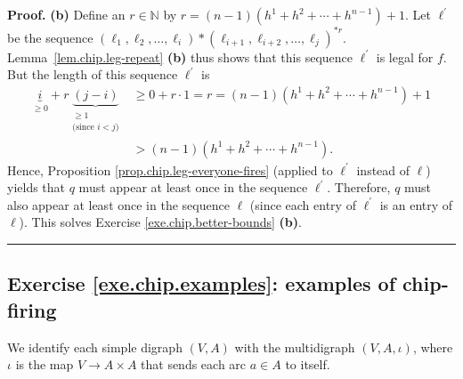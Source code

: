 \documentclass[numbers=enddot,12pt,final,onecolumn,notitlepage]{scrartcl}%
\theoremstyle{definition}
\newenvironment{proof}[1][Proof]{\noindent\textbf{#1.} }{\ \rule{0.5em}{0.5em}}
\newcommand{\NN}{\mathbb{N}}
\newcommand{\tup}[1]{\left( #1 \right)}
\begin{document}
\begin{proof}
\textbf{(b)} Define an $r \in \NN$ by
$r = \tup{n - 1} \tup{ h^1 + h^2 + \cdots + h^{n-1} } + 1$.
Let $\ell^{\prime}$ be the sequence
$\left(  \ell_{1}%
,\ell_{2},\ldots,\ell_{i}\right)  \ast\left(  \ell_{i+1},\ell_{i+2}%
,\ldots,\ell_{j}\right)  ^{\ast r}$.
Lemma~\ref{lem.chip.leg-repeat} \textbf{(b)} thus shows that
this sequence $\ell^\prime$ is legal for $f$.
But the length of this sequence $\ell^{\prime}$ is
\begin{align*}
\underbrace{i}_{\geq0}+r\underbrace{\left(  j-i\right)  }_{\substack{\geq
1\\\text{(since }i<j\text{)}}}  &  \geq0+r\cdot1=r=\left(  n-1\right)  \left(
h^1 + h^2 + \cdots + h^{n-1} \right)  +1\\
&  >\left(  n-1\right)  \left(  h^1 + h^2 + \cdots + h^{n-1} \right)  .
\end{align*}
Hence, Proposition \ref{prop.chip.leg-everyone-fires} (applied to
$\ell^{\prime}$ instead of $\ell$) yields that $q$ must appear at least once
in the sequence $\ell^{\prime}$. Therefore, $q$ must also appear at least once
in the sequence $\ell$ (since each entry of $\ell^{\prime}$ is an entry of
$\ell$). This solves Exercise \ref{exe.chip.better-bounds} \textbf{(b)}.
\end{proof}

\subsection{Exercise \ref{exe.chip.examples}: examples of chip-firing}

We identify each simple digraph $\tup{V, A}$ with the multidigraph
$\tup{V, A, \iota}$, where $\iota$ is the map $V \to A \times A$ that
sends each arc $a \in A$ to itself.
\end{document}
